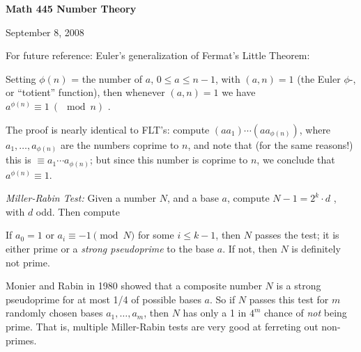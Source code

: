 




\nopagenumbers
\parindent=-20pt

\overfullrule=0pt

\def\ctln{\centerline}
\def\u{\underbar}
\def\ssk{\smallskip}
\def\msk{\medskip}
\def\bsk{\bigskip}


\ctln{\bf Math 445 Number Theory}

\medskip

\ctln{September 8, 2008}

\bigskip

For future reference: Euler's generalization of Fermat's Little Theorem:

\msk

Setting $\phi(n)$ = the number of $a$, $0\leq a\leq n-1$, with $(a,n)=1$ (the Euler
$\phi$-, or ``totient'' function), then whenever $(a,n)=1$ we have
$a^{\phi(n)}\equiv 1\ (\mod n)$ . 

\ssk

The proof is nearly identical to FLT's: compute $(aa_1)\cdots (aa_{\phi(n)})$, where
$a_1,\ldots,a_{\phi(n)}$ are the numbers coprime to $n$, and note that (for the same
reasons!) this is $\equiv a_1\cdots a_{\phi(n)}$; but since this number is coprime to 
$n$, we conclude that $a^{\phi(n)}\equiv 1$.

\msk

{\it Miller-Rabin Test:} Given a number $N$, and a base $a$, compute $N-1 = 2^k\cdot d$ , with $d$ odd. Then compute

\ssk


\ssk

If $a_0=1$ or $a_i\equiv -1\pmod{N}$ for some $i\leq k-1$, then $N$ passes the test; it is either prime or a {\it strong
pseudoprime} to the base $a$. If not, then $N$ is definitely not prime.

\msk

Monier and Rabin in 1980 showed that a composite number $N$ is a strong pseudoprime for at most 1/4 of possible
bases $a$. So if $N$ passes this test for $m$ randomly chosen bases $a_1,\ldots ,a_m$, then $N$ has only a 1 in $4^m$
chance of {\it not} being prime. That is, multiple Miller-Rabin tests are very good at ferreting out non-primes.

\bsk

